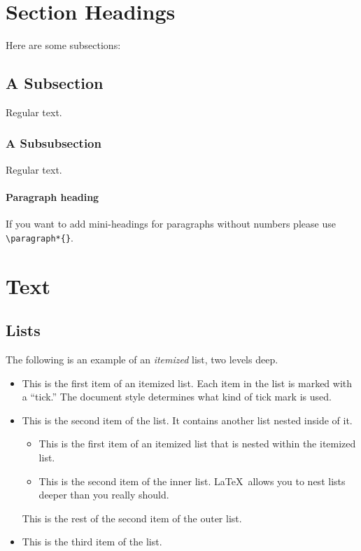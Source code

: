 \documentclass[te,nameyear,final,supplement]{econsocart}
\theoremstyle{plain}
\theoremstyle{definition}
\begin{document}
\section{Section Headings}
Here are some subsections:
\subsection{A Subsection}
Regular text.
\subsubsection{A Subsubsection}
Regular text.

\paragraph*{Paragraph heading} If you want to add mini-headings for paragraphs without numbers please use \verb|\paragraph*{}|.

\section{Text}

\subsection{Lists}

The following is an example of an \emph{itemized} list,
two levels deep.
\begin{itemize}
\item
This is the first item of an itemized list.  Each item
in the list is marked with a ``tick.''  The document
style determines what kind of tick mark is used.
\item
This is the second item of the list.  It contains another
list nested inside of it.
\begin{itemize}
\item This is the first item of an itemized list that
is nested within the itemized list.
\item This is the second item of the inner list.  \LaTeX\
allows you to nest lists deeper than you really should.
\end{itemize}
This is the rest of the second item of the outer list.
\item
This is the third item of the list.
\end{itemize}
\end{document}
